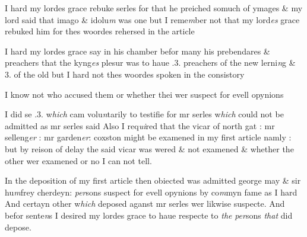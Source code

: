 \documentclass[12pt, a4paper]{book}
\begin{document}
            		
				\marginpar[\vspace{0.5cm}{\textcolor{Gray}{4}}]{}
			

		\ifthenelse{\isodd{\thepage}}
		{\reversemarginpar}
		{\normalmarginpar}
		I hard my lordes grace  rebuke serles for that he preiched somuch
of ymages \& my lord said that imago \& idolu\textit{m} was one but I 
reme\textit{m}ber not that my lord\textit{es} grace  rebuked him for thes woordes 
rehersed in the article
            		
				\marginpar[\vspace{0.5cm}{\textcolor{Gray}{5}}]{}
			

		\ifthenelse{\isodd{\thepage}}
		{\reversemarginpar}
		{\normalmarginpar}
		I hard my lordes grace  say in his chamber befor many his
prebendares \& preachers that the kyng\textit{es} plesur was to haue .3.
preachers of the new lerni\textit{n}g \& 3. of the old but I hard not thes
woordes spoken in the consistory
            		
				\marginpar[\vspace{0.5cm}{\textcolor{Gray}{6}}]{}
			

		\ifthenelse{\isodd{\thepage}}
		{\reversemarginpar}
		{\normalmarginpar}
		I know not who accused them or whether thei wer suspect for
evell opynions
            		
				\marginpar[\vspace{0.5cm}{\textcolor{Gray}{7}}]{}
			

		\ifthenelse{\isodd{\thepage}}
		{\reversemarginpar}
		{\normalmarginpar}
		I did se .3. w\textit{hich} cam volu\textit{n}tarily to testifie for mr serles w\textit{hich} could not 
be admitted as mr serles said Also I req\textit{ui}red that the vicar of north
gat : mr selleng\textit{er} : mr garden\textit{er}: coxston might be examened in my first
article namly : but by reison of delay the said vicar was 
wered \& not examened \& whether the other wer examened or no 
I can not tell.

            		
				\marginpar[\vspace{0.5cm}{\textcolor{Gray}{8}}]{}
			

		\ifthenelse{\isodd{\thepage}}
		{\reversemarginpar}
		{\normalmarginpar}
		In the deposition of my first article then obiected was admitted 
george may \& sir hu\textit{m}frey cherdeyn: \textit{per}sons suspect for evell
opynions by co\textit{m}myn fame as I hard And certayn other w\textit{hich}
deposed aganst mr serles wer likwise suspecte. And befor sente\textit{n}s
I desired my lordes grace  to haue respecte to \textit{the}
               \textit{per}sons \textit{that} did depose.
            		
\end{document}
